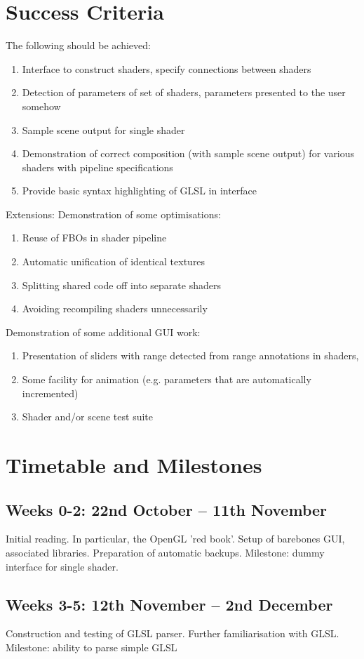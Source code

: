 \section*{Success Criteria}
The following should be achieved:
\begin{enumerate}
\item Interface to construct shaders, specify connections between shaders
\item Detection of parameters of set of shaders, parameters presented to the user somehow
\item Sample scene output for single shader
\item Demonstration of correct composition (with sample scene output) for various shaders with
pipeline specifications
\item Provide basic syntax highlighting of GLSL in interface
\end{enumerate}
Extensions:
Demonstration of some optimisations:
\begin{enumerate}
\item Reuse of FBOs in shader pipeline
\item Automatic unification of identical textures
\item Splitting shared code off into separate shaders
\item Avoiding recompiling shaders unnecessarily
\end{enumerate}
Demonstration of some additional GUI work:
\begin{enumerate}
\item Presentation of sliders with range detected from range annotations in shaders,
\item Some facility for animation (e.g. parameters that are automatically incremented)
\item Shader and/or scene test suite
\end{enumerate}

\section{Timetable and Milestones}
\subsection{Weeks 0-2: 22nd October – 11th November}
Initial reading. In particular, the OpenGL 'red book'. Setup of barebones GUI, associated libraries.
Preparation of automatic backups.
Milestone: dummy interface for single shader.
\subsection{Weeks 3-5: 12th November – 2nd December}
Construction and testing of GLSL parser. Further familiarisation with GLSL.
Milestone: ability to parse simple GLSL
